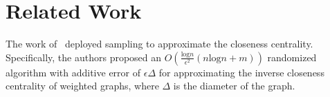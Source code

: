 \section{Related Work}\label{sec:prevwork}

The work of~\citet{EppsteinW04} deployed sampling to approximate the closeness centrality.
Specifically, the authors proposed an $O(\frac{\mbox{log}n}{\epsilon^2}(n\mbox{log}n+m))$ randomized algorithm with additive error of $\epsilon \Delta$ for approximating the inverse closeness centrality of weighted graphs, where $\Delta$ is the diameter of the graph.




